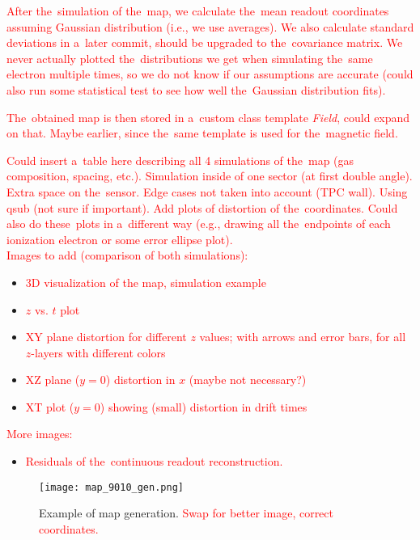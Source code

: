 		\textcolor{red}{After the~simulation of the~map, we calculate the~mean readout coordinates assuming Gaussian distribution (i.e., we use averages). We also calculate standard deviations in a~later commit, should be upgraded to the~covariance matrix. We never actually plotted the~distributions we get when simulating the~same electron multiple times, so we do not know if our assumptions are accurate (could also run some statistical test to see how well the~Gaussian distribution fits).}
		
		\textcolor{red}{The~obtained map is then stored in a~custom class template \textit{Field}, could expand on that. Maybe earlier, since the~same template is used for the~magnetic field.}
		
		\textcolor{red}{Could insert a~table here describing all 4 simulations of the~map (gas composition, spacing, etc.). Simulation inside of one sector (at first double angle). Extra space on the~sensor. Edge cases not taken into account (TPC wall). Using qsub (not sure if important). Add plots of distortion of the~coordinates. Could also do these~plots in a~different way (e.g., drawing all the~endpoints of each ionization electron or some error ellipse plot).}\\
		
		\noindent\textcolor{red}{Images to add (comparison of both simulations):}
		\begin{itemize}[topsep=4pt,itemsep=2pt]
			\item \textcolor{red}{3D visualization of the map, simulation example}
			\item \textcolor{red}{$z$ vs. $t$ plot}
			\item \textcolor{red}{XY plane distortion for different $z$ values; with arrows and error bars, for all $z$-layers with different colors}
			\item \textcolor{red}{XZ plane ($y = 0$) distortion in $x$ (maybe not necessary?)}
			\item \textcolor{red}{XT plot ($y = 0$) showing (small) distortion in drift times}\\
		\end{itemize}
		
		\noindent\textcolor{red}{More images:}
		\begin{itemize}[topsep=4pt,itemsep=2pt]
			\item \textcolor{red}{Residuals of the~continuous readout reconstruction.}
		\end{itemize}		
		
		\begin{figure}[H]
			\centering
			\texttt{[image: map\_9010\_gen.png]}
			\caption{Example of map generation. \textcolor{red}{Swap for better image, correct coordinates.}}
			\label{fig:map9010gen}
		\end{figure}
		
